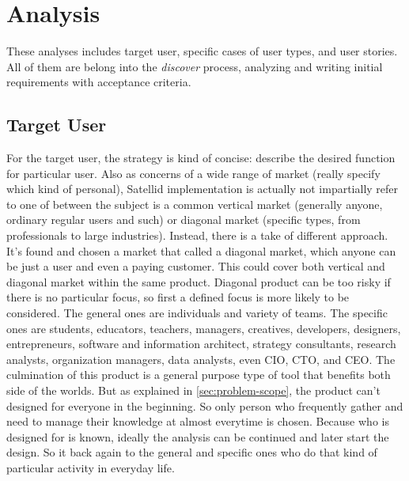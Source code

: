 \section{Analysis}
\label{sec:analysis}

These analyses includes target user, specific cases of user types, and user stories.
All of them are belong into the \textit{discover} process, analyzing and writing initial requirements with acceptance criteria.

\subsection{Target User}

For the target user, the strategy is kind of concise: describe the desired function for particular user.
Also as concerns of a wide range of market (really specify which kind of personal), Satellid implementation is actually not impartially refer to one of between the subject is a common vertical market (generally anyone, ordinary regular users and such) or diagonal market (specific types, from professionals to large industries).
Instead, there is a take of different approach.
It's found and chosen a market that called a diagonal market, which anyone can be just a user and even a paying customer.
This could cover both vertical and diagonal market within the same product.
Diagonal product can be too risky if there is no particular focus, so first a defined focus is more likely to be considered.
The general ones are individuals and variety of teams.
The specific ones are students, educators, teachers, managers, creatives, developers, designers, entrepreneurs, software and information architect, strategy consultants, research analysts, organization managers, data analysts, even \ac{CIO}, \ac{CTO}, and \ac{CEO}.
The culmination of this product is a general purpose type of tool that benefits both side of the worlds.
But as explained in \autoref{sec:problem-scope}, the product can't designed for everyone in the beginning.
So only person who frequently gather and need to manage their knowledge at almost everytime is chosen.
Because who is designed for is known, ideally the analysis can be continued and later start the design.
So it back again to the general and specific ones who do that kind of particular activity in everyday life.


